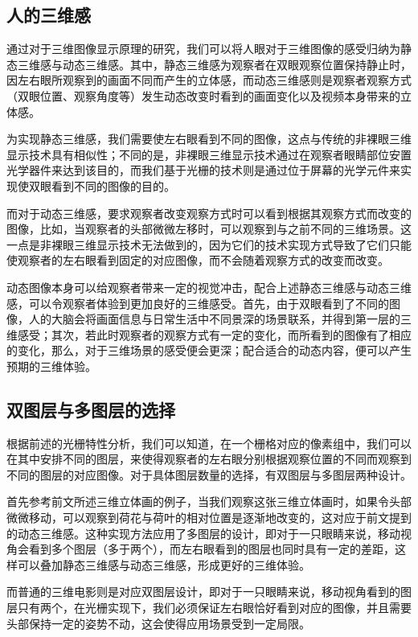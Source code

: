 \documentclass[12pt,a4paper]{article}
\begin{document}
\subsection{人的三维感}
通过对于三维图像显示原理的研究，我们可以将人眼对于三维图像的感受归纳为静态三维感与动态三维感。其中，静态三维感为观察者在双眼观察位置保持静止时，因左右眼所观察到的画面不同而产生的立体感，而动态三维感则是观察者观察方式（双眼位置、观察角度等）发生动态改变时看到的画面变化以及视频本身带来的立体感。

为实现静态三维感，我们需要使左右眼看到不同的图像，这点与传统的非裸眼三维显示技术具有相似性；不同的是，非裸眼三维显示技术通过在观察者眼睛部位安置光学器件来达到该目的，而我们基于光栅的技术则是通过位于屏幕的光学元件来实现使双眼看到不同的图像的目的。

而对于动态三维感，要求观察者改变观察方式时可以看到根据其观察方式而改变的图像，比如，当观察者的头部微微左移时，可以观察到与之前不同的三维场景。这一点是非裸眼三维显示技术无法做到的，因为它们的技术实现方式导致了它们只能使观察者的左右眼看到固定的对应图像，而不会随着观察方式的改变而改变。

动态图像本身可以给观察者带来一定的视觉冲击，配合上述静态三维感与动态三维感，可以令观察者体验到更加良好的三维感受。首先，由于双眼看到了不同的图像，人的大脑会将画面信息与日常生活中不同景深的场景联系，并得到第一层的三维感受；其次，若此时观察者的观察方式有一定的变化，而所看到的图像有了相应的变化，那么，对于三维场景的感受便会更深；配合适合的动态内容，便可以产生预期的三维体验。

\subsection{双图层与多图层的选择}
根据前述的光栅特性分析，我们可以知道，在一个栅格对应的像素组中，我们可以在其中安排不同的图层，来使得观察者的左右眼分别根据观察位置的不同而观察到不同的图层的对应图像。对于具体图层数量的选择，有双图层与多图层两种设计。

首先参考前文所述三维立体画的例子，当我们观察这张三维立体画时，如果令头部微微移动，可以观察到荷花与荷叶的相对位置是逐渐地改变的，这对应于前文提到的动态三维感。这种实现方法应用了多图层的设计，即对于一只眼睛来说，移动视角会看到多个图层（多于两个），而左右眼看到的图层也同时具有一定的差距，这样可以叠加静态三维感与动态三维感，形成更好的三维体验。

而普通的三维电影则是对应双图层设计，即对于一只眼睛来说，移动视角看到的图层只有两个，在光栅实现下，我们必须保证左右眼恰好看到对应的图像，并且需要头部保持一定的姿势不动，这会使得应用场景受到一定局限。
\end{document}
